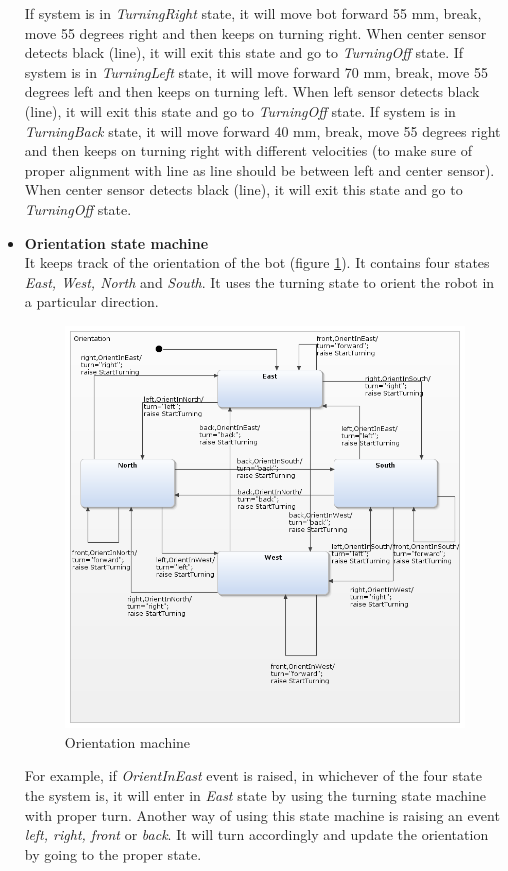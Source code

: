 \documentclass[a4paper,12pt,oneside]{book}
\begin{document}
\begin{itemize}
If system is in \textit{TurningRight} state, it will move bot forward 55 mm, break, move 55 degrees right and then keeps on turning right. When center sensor detects black (line), it will exit this state and go to \textit{TurningOff} state.
If system is in \textit{TurningLeft} state, it will move forward 70 mm, break, move 55 degrees left and then keeps on turning left. When left sensor detects black (line), it will exit this state and go to \textit{TurningOff} state.
If system is in \textit{TurningBack} state, it will move forward 40 mm, break, move 55 degrees right and then keeps on turning right with different velocities (to make sure of proper alignment with line as line should be between left and center sensor). When center sensor detects black (line), it will exit this state and go to \textit{TurningOff} state.

\item \textbf{Orientation state machine}\\
It keeps track of the orientation of the bot (figure \ref{orientation}). It contains four states \textit{East, West, North} and \textit{South}. It uses the turning state to orient the robot in a particular direction. 
\begin{figure}[h]
	\centering
	\includegraphics[scale=.6]{orientation.png}
	\caption{Orientation machine}
	\label{orientation}
\end{figure}
For example, if \textit{OrientInEast} event is raised, in whichever of the four state the system is, it will enter in \textit{East} state by using the turning state machine with proper turn. Another way of using this state machine is raising an event \textit{left, right, front} or \textit{back}. It will turn accordingly and update the orientation by going to the proper state.


\end{itemize}
\end{document}
